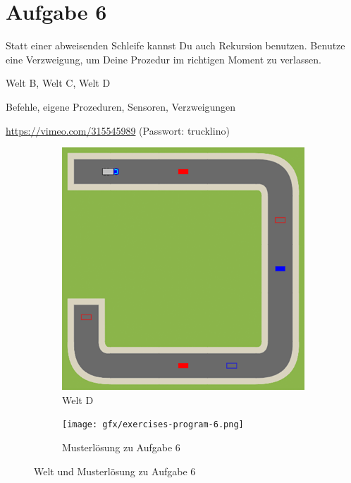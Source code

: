 \pagebreak

\section{Aufgabe 6}
\label{sec:exercises:6}

Statt einer abweisenden Schleife kannst Du auch Rekursion benutzen. Benutze eine Verzweigung, um Deine Prozedur im richtigen Moment zu verlassen.

\begin{description}[noitemsep]
  \item[Welt wählen:] Welt B, Welt C, Welt D
  \item[Du brauchst:] Befehle, eigene Prozeduren, Sensoren, Verzweigungen
  \item[Video:] \url{https://vimeo.com/315545989} (Passwort: trucklino)
\end{description}

\begin{figure}[H]
  \begin{subfigure}[b]{0.40\textwidth}
    \includegraphics[width=\textwidth]{gfx/exercises-world-d.png}
    \caption{Welt D}
  \end{subfigure}\hfill
  \begin{subfigure}[b]{0.40\textwidth}
    \texttt{[image: gfx/exercises-program-6.png]}
    \caption{Musterlösung zu Aufgabe 6}
  \end{subfigure}\hfill
  \caption{Welt und Musterlösung zu Aufgabe 6}
\end{figure}


